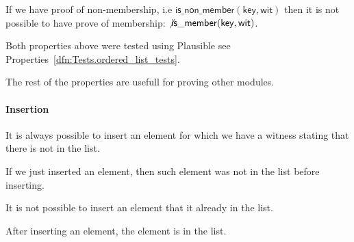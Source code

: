 \begin{theorem}
  \label{thm:MOList.Properties.non_member_is_not_member}
  \leanok
  If we have proof of non-membership, i.e \( \mathsf{is\_non\_member(key,wit)}\)
then it is not possible to have prove of membership:
\(\not \mathsf{is\_member(key,wit)}\).
  \end{theorem}

Both properties above were tested using Plausible see Properties~\ref{dfn:Tests.ordered_list_tests}.

The rest of the properties are usefull for proving other modules.

\paragraph*{Insertion}

\begin{theorem}
  \label{thm:MOList.Properties.insert_non_member}
  \leanok
  It is always possible to insert an element for which we have a witness stating
that there is not in the list.
  \end{theorem}

\begin{theorem}
  \label{thm:MOList.Properties.inserted_non_member}
  \leanok
  If we just inserted an element, then such element was not in the list before
inserting.
  \end{theorem}

\begin{theorem}
  \label{thm:MOList.Properties.not_insert_member}
  \leanok
  It is not possible to insert an element that it already in the list.
  \end{theorem}

\begin{theorem}
  \label{thm:MOList.Properties.insert_diff_new}
  \leanok
  After inserting an element, the element is in the list.
  \end{theorem}

